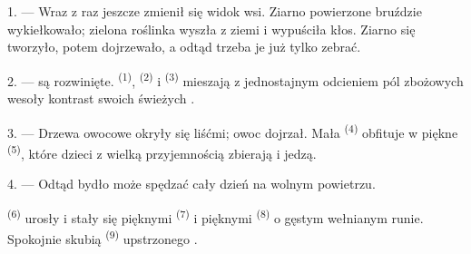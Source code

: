%
%


\VUsaut{5.0mm}
\VUsaut{3.0mm}
\VUsaut{3.0mm}
\VUsaut{4.0mm}
\VUsaut{3.0mm}

1. --- Wraz z  raz jeszcze zmienił się widok wsi. Ziarno powierzone
bruździe wykiełkowało; zielona roślinka wyszła z ziemi i wypuściła kłos. Ziarno się
tworzyło, potem dojrzewało, a odtąd trzeba je już tylko zebrać.

2. ---  są rozwinięte.  \textsuperscript{(1)},
 \textsuperscript{(2)} i  \textsuperscript{(3)} mieszają
z jednostajnym odcieniem pól zbożowych wesoły kontrast swoich świeżych .

3. --- Drzewa owocowe okryły się liśćmi; owoc dojrzał. Mała 
\textsuperscript{(4)} obfituje w piękne  \textsuperscript{(5)}, które
dzieci z wielką przyjemnością zbierają i jedzą.

4. --- Odtąd bydło może spędzać cały dzień na wolnym powietrzu.

 \textsuperscript{(6)} urosły i stały się pięknymi 
\textsuperscript{(7)} i pięknymi  \textsuperscript{(8)} o gęstym wełnianym
runie. Spokojnie skubią   \textsuperscript{(9)} upstrzonego
.

